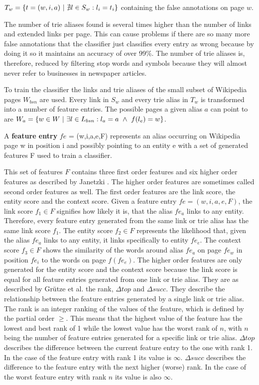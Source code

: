 $T_w = \{ t = (w,i,a) {\mbox{ }|\mbox{ }} \nexists l \in S_w: l_i = t_i \}$ containing the false annotations on page $w$.\par
The number of trie aliases found is several times higher than the number of links and extended links per page. This can cause problems if there are so many more false annotations that the classifier just classifies every entry as wrong because by doing it so it maintains an accuracy of over 99\%. The number of trie aliases is, therefore, reduced by filtering stop words and symbols because they will almost never refer to businesses in newspaper articles.\par
To train the classifier the links and trie aliases of the small subset of Wikipedia pages $W_{bsn}$ are used. Every link in $S_w$ and every trie alias in $T_w$ is transformed into a number of feature entries. The possible pages a given alias $a$ can point to are $W_a = \{ w \in W {\mbox{ }|\mbox{ }} \exists l \in L_{bsn}: l_a = a {\mbox{ }\wedge\mbox{ }} f(l_e) = w \}$.
\begin{definition}
A \textbf{feature entry} $fe$ = (w,i,a,e,F) represents an alias occurring on Wikipedia page w in position i and possibly pointing to an entity e with a set of generated features F used to train a classifier.
\label{featureentry}
\end{definition}
This set of features $F$ contains three first order features and six higher order features as described by Janetzki \cite{janetzki}. The higher order features are sometimes called second order features as well. The first order features are the link score, the entity score and the context score. Given a feature entry $fe = (w,i,a,e,F)$, the link score $f_1 \in F$ signifies how likely it is, that the alias $fe_a$ links to any entity. Therefore, every feature entry generated from the same link or trie alias has the same link score $f_1$. The entity score $f_2 \in F$ represents the likelihood that, given the alias $fe_a$ links to any entity, it links specifically to entity $fe_e$. The context score $f_3 \in F$ shows the similarity of the words around alias $fe_a$ on page $fe_w$ in position $fe_i$ to the words on page $f(fe_e)$. The higher order features are only generated for the entity score and the context score because the link score is equal for all feature entries generated from one link or trie alias. They are as described by Grütze et al. \cite{coheel} the rank, $\Delta top$ and $\Delta succ$. They describe the relationship between the feature entries generated by a single link or trie alias. The rank is an integer ranking of the values of the feature, which is defined by the partial order $\geq$. This means that the highest value of the feature has the lowest and best rank of 1 while the lowest value has the worst rank of $n$, with $n$ being the number of feature entries generated for a specific link or trie alias. $\Delta top$ describes the difference between the current feature entry to the one with rank 1. In the case of the feature entry with rank 1 its value is $\infty$. $\Delta succ$ describes the difference to the feature entry with the next higher (worse) rank. In the case of the worst feature entry with rank $n$ its value is also $\infty$.\par

